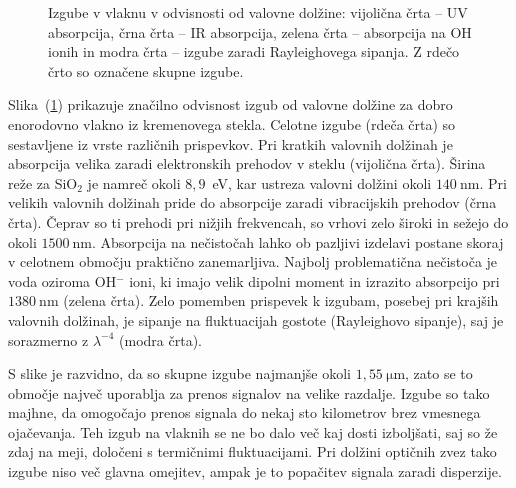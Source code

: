 \begin{figure}[h]
\centering
\def\svgwidth{90truemm} 
 
\caption{Izgube v vlaknu v odvisnosti od valovne dolžine: vijolična črta -- UV absorpcija, 
črna črta -- IR absorpcija, zelena črta -- absorpcija na OH ionih in modra črta --
izgube zaradi Rayleighovega sipanja. Z rdečo črto so označene skupne izgube.}
\label{FibAbs}
\end{figure}
Slika~(\ref{FibAbs}) prikazuje značilno odvisnost izgub od valovne dolžine 
za dobro enorodovno vlakno iz kremenovega stekla. 
Celotne izgube (rdeča črta)
so sestavljene iz vrste različnih prispevkov. 
Pri kratkih valovnih dolžinah je absorpcija velika zaradi elektronskih prehodov
v steklu (vijolična črta). 
Širina reže za SiO$_2$ je namreč okoli $8,9$~eV, 
kar ustreza valovni dolžini
okoli $140~\si{\nano\meter}$. Pri velikih valovnih dolžinah pride do absorpcije zaradi
vibracijskih prehodov (črna črta). Čeprav so ti prehodi pri nižjih frekvencah, 
so vrhovi zelo široki in sežejo do okoli $1500~\si{\nano\meter}$. 
Absorpcija na nečistočah lahko ob pazljivi izdelavi postane skoraj v celotnem 
območju praktično zanemarljiva. 
Najbolj problematična nečistoča je voda oziroma OH$^{-}$ ioni, ki imajo velik dipolni
moment in izrazito absorpcijo pri $1380~\si{\nano\meter}$ (zelena črta). Zelo pomemben prispevek k 
izgubam, posebej pri krajših valovnih dolžinah, je sipanje na fluktuacijah 
gostote (Rayleighovo sipanje), 
saj je sorazmerno z $\lambda^{-4}$ (modra črta). 

S slike je razvidno, da so skupne izgube najmanjše
okoli $1,55~\si{\micro\meter}$, zato se to območje največ uporablja za prenos signalov
na velike razdalje. Izgube so tako majhne, da omogočajo prenos signala 
do nekaj sto kilometrov brez vmesnega ojačevanja. Teh izgub na vlaknih se  
ne bo dalo več kaj dosti izboljšati, saj so že zdaj na meji,
določeni s termičnimi fluktuacijami. Pri dolžini optičnih zvez tako izgube niso več glavna
omejitev, ampak je to popačitev signala zaradi disperzije.

